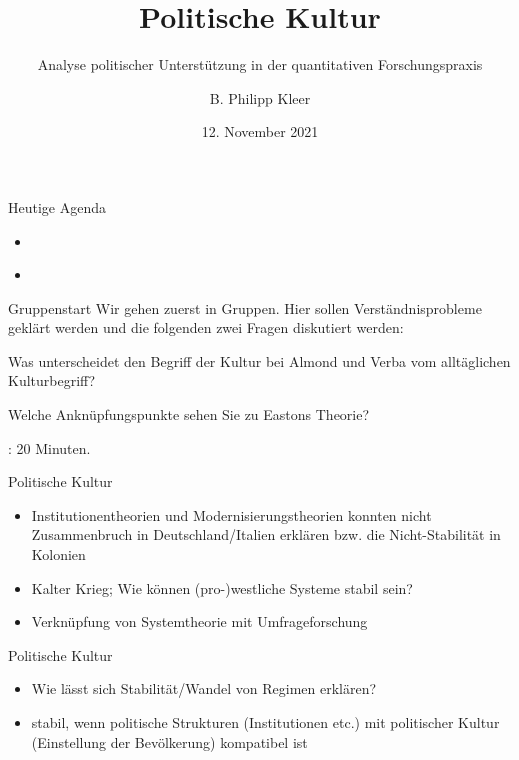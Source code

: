 \documentclass[11pt]{beamer}
\title{Politische Kultur}
\subtitle{Analyse politischer Unterstützung in der quantitativen Forschungspraxis}
\date{12. November 2021}
\author{B. Philipp Kleer}
\institute{Institut für Politikwissenschaft | Justus-Liebig-Universität Gießen}
\begin{document}
\begin{frame}
	\titlepage
\end{frame}

\begin{frame}[t]{Heutige Agenda}
	\begin{itemize}
		\item \cite{Almond1963}
		\item \cite{Gabriel2009}
	\end{itemize}
\end{frame}

\begin{frame}[t]{Gruppenstart}
	Wir gehen zuerst in Gruppen. Hier sollen Verständnisprobleme geklärt werden und die folgenden zwei Fragen diskutiert werden:
	
	\begin{nolist}
		\item Was unterscheidet den Begriff der Kultur bei Almond und Verba vom alltäglichen Kulturbegriff?
		\item Welche Anknüpfungspunkte sehen Sie zu Eastons Theorie?
	\end{nolist}
	
	: 20 Minuten.
\end{frame}

\begin{frame}[t]{Politische Kultur}
	\begin{itemize}
		\item Institutionentheorien und Modernisierungstheorien konnten nicht Zusammenbruch in Deutschland/Italien erklären bzw. die Nicht-Stabilität in Kolonien \pause
	\end{itemize}
	
	\begin{itemize}
		\item Kalter Krieg; Wie können (pro-)westliche Systeme stabil sein?
		\item Verknüpfung von Systemtheorie mit Umfrageforschung
	\end{itemize}
\end{frame}

\begin{frame}[t]{Politische Kultur}
	\begin{itemize}
		\item Wie lässt sich Stabilität/Wandel von Regimen erklären? \pause
	\end{itemize}
	
	\begin{itemize}
		\item stabil, wenn politische Strukturen (Institutionen etc.) mit politischer Kultur (Einstellung der Bevölkerung) kompatibel ist
	\end{itemize}
\end{frame}
\end{document}
